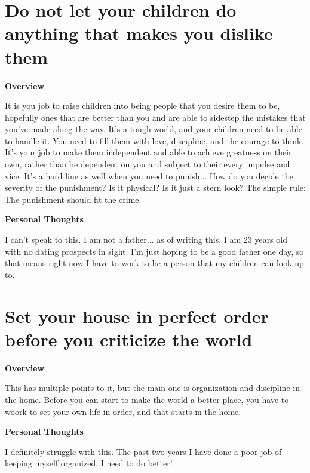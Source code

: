 \documentclass{article}
\begin{document}
\section{Do not let your children do anything that makes you dislike them}
        \begin{multicols}{2}
        \begin{center}
            \textbf{Overview}
        \end{center}
        
        It is you job to raise children into being people that you desire them to be, hopefully ones that are better than you and are able to sidestep the mistakes that you've made along the way. It's a tough world, and your children need to be able to handle it. You need to fill them with love, discipline, and the courage to think. It's your job to make them independent and able to achieve greatness on their own, rather than be dependent on you and subject to their every impulse and vice. It's a hard line as well when you need to punish... How do you decide the severity of the punishment? Is it physical? Is it just a stern look? The simple rule: The punishment should fit the crime.

        \begin{center}
            \textbf{Personal Thoughts}
        \end{center}
        
        I can't speak to this. I am not a father... as of writing this, I am 23 years old with no dating prospects in sight. I'm just hoping to be a good father one day, so that means right now I have to work to be a person that my children can look up to.
    \end{multicols}

\section{Set your house in perfect order before you criticize the world}
        \begin{multicols}{2}
        \begin{center}
            \textbf{Overview}
        \end{center}
        
        This has multiple points to it, but the main one is organization and discipline in the home. Before you can start to make the world a better place, you have to woork to set your own life in order, and that starts in the home.

        \begin{center}
            \textbf{Personal Thoughts}
        \end{center}
        
        I definitely struggle with this. The past two years I have done a poor job of keeping myself organized. I need to do better!
    \end{multicols}
    
\end{document}
